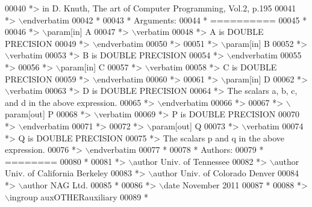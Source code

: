 \begin{DoxyCode}
00040 \textcolor{comment}{*> in D. Knuth, The art of Computer Programming, Vol.2, p.195}
00041 \textcolor{comment}{*> \(\backslash\)endverbatim}
00042 \textcolor{comment}{*}
00043 \textcolor{comment}{*  Arguments:}
00044 \textcolor{comment}{*  ==========}
00045 \textcolor{comment}{*}
00046 \textcolor{comment}{*> \(\backslash\)param[in] A}
00047 \textcolor{comment}{*> \(\backslash\)verbatim}
00048 \textcolor{comment}{*>          A is DOUBLE PRECISION}
00049 \textcolor{comment}{*> \(\backslash\)endverbatim}
00050 \textcolor{comment}{*>}
00051 \textcolor{comment}{*> \(\backslash\)param[in] B}
00052 \textcolor{comment}{*> \(\backslash\)verbatim}
00053 \textcolor{comment}{*>          B is DOUBLE PRECISION}
00054 \textcolor{comment}{*> \(\backslash\)endverbatim}
00055 \textcolor{comment}{*>}
00056 \textcolor{comment}{*> \(\backslash\)param[in] C}
00057 \textcolor{comment}{*> \(\backslash\)verbatim}
00058 \textcolor{comment}{*>          C is DOUBLE PRECISION}
00059 \textcolor{comment}{*> \(\backslash\)endverbatim}
00060 \textcolor{comment}{*>}
00061 \textcolor{comment}{*> \(\backslash\)param[in] D}
00062 \textcolor{comment}{*> \(\backslash\)verbatim}
00063 \textcolor{comment}{*>          D is DOUBLE PRECISION}
00064 \textcolor{comment}{*>          The scalars a, b, c, and d in the above expression.}
00065 \textcolor{comment}{*> \(\backslash\)endverbatim}
00066 \textcolor{comment}{*>}
00067 \textcolor{comment}{*> \(\backslash\)param[out] P}
00068 \textcolor{comment}{*> \(\backslash\)verbatim}
00069 \textcolor{comment}{*>          P is DOUBLE PRECISION}
00070 \textcolor{comment}{*> \(\backslash\)endverbatim}
00071 \textcolor{comment}{*>}
00072 \textcolor{comment}{*> \(\backslash\)param[out] Q}
00073 \textcolor{comment}{*> \(\backslash\)verbatim}
00074 \textcolor{comment}{*>          Q is DOUBLE PRECISION}
00075 \textcolor{comment}{*>          The scalars p and q in the above expression.}
00076 \textcolor{comment}{*> \(\backslash\)endverbatim}
00077 \textcolor{comment}{*}
00078 \textcolor{comment}{*  Authors:}
00079 \textcolor{comment}{*  ========}
00080 \textcolor{comment}{*}
00081 \textcolor{comment}{*> \(\backslash\)author Univ. of Tennessee }
00082 \textcolor{comment}{*> \(\backslash\)author Univ. of California Berkeley }
00083 \textcolor{comment}{*> \(\backslash\)author Univ. of Colorado Denver }
00084 \textcolor{comment}{*> \(\backslash\)author NAG Ltd. }
00085 \textcolor{comment}{*}
00086 \textcolor{comment}{*> \(\backslash\)date November 2011}
00087 \textcolor{comment}{*}
00088 \textcolor{comment}{*> \(\backslash\)ingroup auxOTHERauxiliary}
00089 \textcolor{comment}{*}

\end{DoxyCode}
